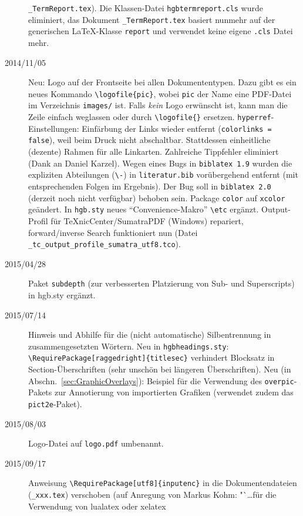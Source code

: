 \begin{sloppypar}
\begin{description}
\texttt{\_TermReport.tex}).
\newline
Die Klassen-Datei \texttt{hgbtermreport.cls} wurde eliminiert, das Dokument \texttt{\_TermReport.tex} basiert nunmehr
auf der generischen LaTeX-Klasse \texttt{report}  und verwendet keine eigene \texttt{.cls} Datei mehr.
%
\item[2014/11/05]
Neu: Logo auf der Frontseite bei allen Dokumententypen. Dazu gibt es ein neues Kommando
\verb!\logofile{pic}!, wobei \verb!pic! der Name eine PDF-Datei im
Verzeichnis \verb!images/! ist. Falls \emph{kein} Logo erwünscht ist, 
kann man die Zeile einfach weglassen oder durch \verb!\logofile{}! ersetzen.
\newline
\texttt{hyperref}-Einstellungen: Einfärbung der Links wieder entfernt (\texttt{colorlinks = false}), weil beim Druck
nicht abschaltbar. Stattdessen einheitliche (dezente) Rahmen für alle Linkarten.
Zahlreiche Tippfehler eliminiert (Dank an Daniel Karzel).
\newline
Wegen eines Bugs in \texttt{biblatex 1.9} wurden die expliziten Abteilungen (\verb!\-!) in \texttt{literatur.bib}
vorübergehend entfernt (mit entsprechenden Folgen im Ergebnis). Der Bug soll in \texttt{biblatex 2.0} (derzeit noch
nicht verfügbar) behoben sein.
\newline
Package \texttt{color} auf \texttt{xcolor} geändert. In \texttt{hgb.sty} neues "`Convenience-Makro"' \verb!\etc! ergänzt.
Output-Profil für TeXnicCenter/SumatraPDF (Windows) repariert, forward/inverse Search funktioniert nun
(Datei \verb!_tc_output_profile_sumatra_utf8.tco!).
%
\item[2015/04/28]
Paket \texttt{subdepth} (zur verbesserten Platzierung von Sub- und Superscripts) 
in hgb.sty ergänzt.
%
\item[2015/07/14]
Hinweis und Abhilfe für die (nicht automatische) Silbentrennung in zusammengesetzten Wörtern.
Neu in \texttt{hgbheadings.sty}: \verb!\RequirePackage[raggedright]{titlesec}! verhindert Blocksatz
in Section-Überschriften (sehr unschön bei längeren Überschriften). 
Neu (in Abschn.~\ref{sec:GraphicOverlays}): Beispiel für die Verwendung des \texttt{overpic}-Pakets
zur Annotierung von importierten Grafiken (verwendet zudem das \texttt{pict2e}-Paket).
%
\item[2015/08/03]
Logo-Datei auf \texttt{logo.pdf} umbenannt.
\item[2015/09/17]
Anweisung \verb!\RequirePackage[utf8]{inputenc}! in die Doku\-menten\-dateien (\texttt{\_xxx.tex})
verschoben (auf Anregung von Markus Kohm: "`\ldots für die Verwendung von lualatex oder xelatex 

\end{description}
\end{sloppypar}
